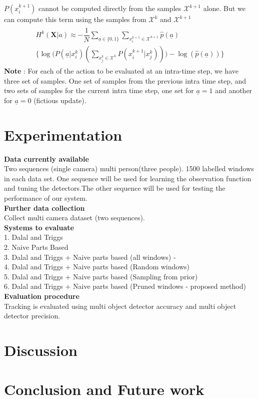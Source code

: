 \documentclass[10pt,twocolumn,letterpaper]{article}
\begin{document}
$P(x^{k+1}_{i})$ cannot be computed directly from the samples $\mathcal{X}^{k+1}$ alone. But we can compute this term using the samples from $\mathcal{X}^{k}$ and $\mathcal{X}^{k+1}$
\begin{align}
\begin{split}
H^{k}(\textbf{X}| a)\approx -\dfrac{1}{N}\sum_{\underline{a}\in\lbrace 0 ,1 \rbrace} \sum_{x_{i}^{k+1}\in\mathcal{X}^{k+1}} \widehat{p}( \underline{a}) \\ \Big\lbrace\log\Big(P( \underline{a}|x^{k}_{i})(\sum_{x_{j}^{k}\in\mathcal{X}^{k}}P(x^{k+1}_{i}|x^{k}_{j}))\Big) - \log(\widehat{p}( \underline{a}))\Big\rbrace
\end{split}
\end{align}
\textbf{Note} :
For each of the action to be evaluated at an intra-time step, we have three set of samples. One set of samples from the previous intra time step, and two sets of samples for the current intra time step, one set for $\underline{a}=1$ and another for $\underline{a}=0$ (fictious update).
  
\section{Experimentation}

\textbf{Data currently available}\\ 
Two sequences (single camera) multi person(three people). 1500 labelled windows in each data set. One sequence will be used for learning the observation function and tuning the detectors.The other sequence will be used for testing the performance of our system.\\

\textbf{Further data collection}\\
Collect multi camera dataset (two sequences).\\

\textbf{Systems to evaluate}\\
1. Dalal and Triggs\\ 
2. Naive Parts Based\\ 
3. Dalal and Triggs + Naive parts based (all windows) - \\
4. Dalal and Triggs + Naive parts based (Random windows)\\
5. Dalal and Triggs + Naive parts based (Sampling from prior)\\
6. Dalal and Triggs + Naive parts based (Pruned windows - proposed method)\\
 

\textbf{Evaluation procedure}\\
Tracking is evaluated using multi object detector accuracy and multi object detector precision.

\section{Discussion}


\section{Conclusion and Future work}
{\small


}
\end{document}
